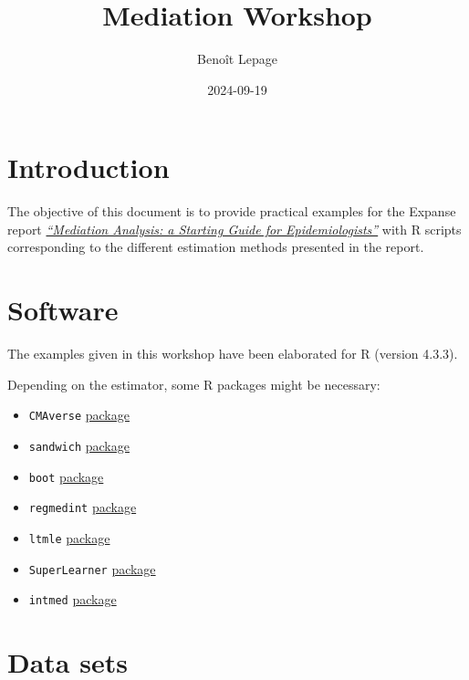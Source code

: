 \documentclass[
]{book}
\title{Mediation Workshop}
\author{Benoît Lepage}
\date{2024-09-19}
\begin{document}
\maketitle

{
\setcounter{tocdepth}{1}
\tableofcontents
}
\chapter{Introduction}\label{introduction}

The objective of this document is to provide practical examples for the Expanse report \href{https://github.com/benoitlepage/mediation_workshop/blob/main/Expanse\%20report/Mediation_BL-2024-03-29.pdf}{\emph{``Mediation Analysis: a Starting Guide for Epidemiologists''}} with R scripts corresponding to the different estimation methods presented in the report.

\chapter{Software}\label{software}

The examples given in this workshop have been elaborated for R (version 4.3.3).

Depending on the estimator, some R packages might be necessary:

\begin{itemize}
\item
  \texttt{CMAverse} \href{https://bs1125.github.io/CMAverse/}{package}
\item
  \texttt{sandwich} \href{https://sandwich.r-forge.r-project.org/articles/sandwich.html}{package}
\item
  \texttt{boot} \href{https://cran.r-project.org/web/packages/boot/index.html}{package}
\item
  \texttt{regmedint} \href{https://kaz-yos.github.io/regmedint/}{package}
\item
  \texttt{ltmle} \href{http://joshuaschwab.github.io/ltmle/}{package}
\item
  \texttt{SuperLearner} \href{http://cran.nexr.com/web/packages/SuperLearner/vignettes/Guide-to-SuperLearner.html}{package}
\item
  \texttt{intmed} \href{https://cran.r-project.org/web/packages/intmed/index.html}{package}
\end{itemize}

\chapter{Data sets}\label{data-sets}
\end{document}
